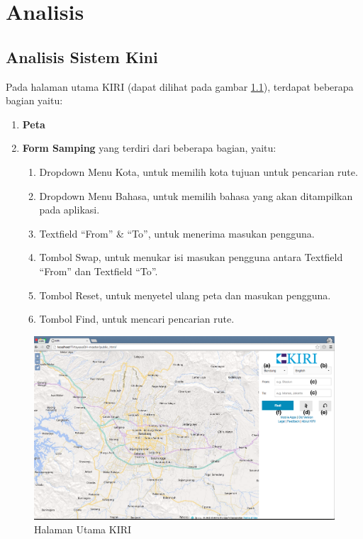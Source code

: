 \chapter{Analisis}
\label{chap:analisis}

\section{Analisis Sistem Kini}
\label{sec:analisiskini}
Pada halaman utama KIRI (dapat dilihat pada gambar \ref{fig:3_KIRI_main}), terdapat beberapa bagian yaitu:

\begin{enumerate}
    		\item \textbf{Peta}
    		\item \textbf{Form Samping} yang terdiri dari beberapa bagian, yaitu:
    		\begin{enumerate}
    			\item Dropdown Menu Kota, untuk memilih kota tujuan untuk pencarian rute.
    			\item Dropdown Menu Bahasa, untuk memilih bahasa yang akan ditampilkan pada aplikasi.
    			\item Textfield ``From'' \& ``To'', untuk menerima masukan pengguna.
    			\item Tombol Swap, untuk menukar isi masukan pengguna antara Textfield ``From'' dan Textfield ``To''.
    			\item Tombol Reset, untuk menyetel ulang peta dan masukan pengguna.
    			\item Tombol Find, untuk mencari pencarian rute.
    		\end{enumerate}
\end{enumerate}

\begin{figure}[H]
	\centering
	\includegraphics[scale=0.3]{Gambar/KIRI-main}
	\caption{Halaman Utama KIRI} 
	\label{fig:3_KIRI_main}
\end{figure}

